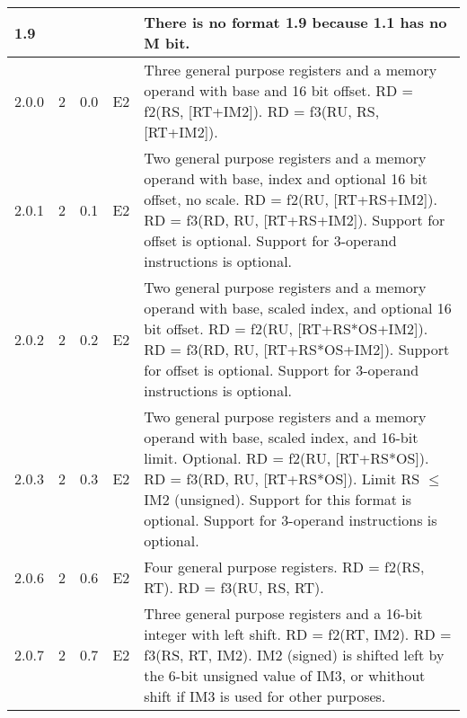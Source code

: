\documentclass[forwardcom.tex]{subfiles}
\begin{document}
\begin{longtable} {|p{10mm}|p{6mm}|p{9mm}|p{7mm}|p{80mm}|}
\hline
1.9 &  &  &  & There is no format 1.9 because 1.1 has no M bit.\\

\hline
2.0.0 & 2 & 0.0  & E2 & Three general purpose registers and a memory operand with base and 16 bit offset.\newline 
RD = f2(RS, [RT+IM2]). \newline 
RD = f3(RU, RS, [RT+IM2]).\\

\hline
2.0.1 & 2 & 0.1  & E2 & Two general purpose registers and a memory operand with base, index and optional 16 bit offset, no scale.\newline  
RD = f2(RU, [RT+RS+IM2]).\newline  
RD = f3(RD, RU, [RT+RS+IM2]). \newline  
Support for offset is optional. \newline 
Support for 3-operand instructions is optional. \\

\hline
2.0.2 & 2 & 0.2  & E2 & Two general purpose registers and a memory operand with base,  scaled index, and optional 16 bit offset.\newline   
RD = f2(RU, [RT+RS*OS+IM2]). \newline 
RD = f3(RD, RU, [RT+RS*OS+IM2]). \newline  
Support for offset is optional. \newline 
Support for 3-operand instructions is optional. \\

\hline
2.0.3 & 2 & 0.3  & E2 & Two general purpose registers and a memory operand with base, scaled index, and 16-bit limit. Optional. \newline 
RD = f2(RU, [RT+RS*OS]). \newline 
RD = f3(RD, RU, [RT+RS*OS]). \newline
Limit RS $\leq$ IM2 (unsigned).\newline 
Support for this format is optional. \newline 
Support for 3-operand instructions is optional. \\

\hline
2.0.6 & 2 & 0.6  & E2 & Four general purpose registers.\newline 
RD = f2(RS, RT). \newline 
RD = f3(RU, RS, RT).\\

\hline
2.0.7 & 2 & 0.7  & E2 & Three general purpose registers and a 16-bit integer with left shift.\newline 
RD = f2(RT, IM2). \newline 
RD = f3(RS, RT, IM2).\newline 
IM2 (signed) is shifted left by the 6-bit unsigned value of IM3, or whithout shift if IM3 is used for other purposes. \\


\end{longtable}
\end{document}
